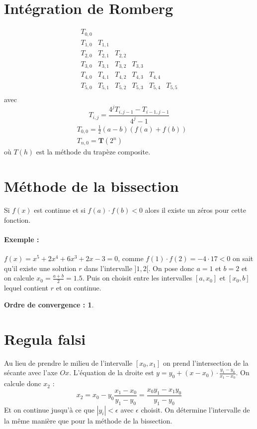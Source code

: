 \documentclass[a4paper,9pt]{extarticle}
\begin{document}
\begin{multicols*}{2}
\section{Intégration de Romberg}
$$
\begin{array}{cccccc}
T_{0,0} & & & & & \\
T_{1,0} & T_{1,1} & & & & \\
T_{2,0} & T_{2,1} & T_{2,2} & & & \\
T_{3,0} & T_{3,1} & T_{3,2} & T_{3,3} & & \\
T_{4,0} & T_{4,1} & T_{4,2} & T_{4,3} & T_{4,4} & \\
T_{5,0} & T_{5,1} & T_{5,2} & T_{5,3} & T_{5,4} & T_{5,5} \\
\end{array}
$$
avec
$$
T_{i,j}=\frac{4^jT_{i,j-1}-T_{i-1,j-1}}{4^j-1}
$$
\begin{align*}
& T_{0,0}=\frac{1}{2}(a-b)(f(a)+f(b))\\
& T_{n,0}=\textbf{T}(2^n)
\end{align*}
où $T(h)$ est la méthode du trapèze composite.

\section{Méthode de la bissection}

Si $f(x)$ est continue et si $f(a) \cdot f(b) < 0$ alors il existe un zéros pour cette fonction.

\paragraph*{Exemple :} $f(x)=x^5+2x^4+6x^3+2x-3=0$, comme $f(1)\cdot f(2) = -4 \cdot 17 < 0$ on sait qu'il existe une solution $r$ dans l'intervalle $]1,2[$. On pose donc $a=1$ et $b=2$ et on calcule $x_0=\frac{a+b}{2}=1.5$. Puis on choisit entre les intervalles $[a,x_0]$ et $[x_0,b]$ lequel contient $r$ et on continue.

\textbf{Ordre de convergence : 1}.

\section{Regula falsi}

Au lieu de prendre le milieu de l'intervalle $[x_0,x_1]$ on prend l'intersection de la sécante avec l'axe $Ox$. L'équation de la droite est $y=y_0+(x-x_0)\cdot\frac{y_1-y_0}{x_1-x_0}$. On calcule donc $x_2$ :
$$
x_2=x_0-y_0\frac{x_1-x_0}{y_1-y_0}=\frac{x_0y_1-x_1y_0}{y_1-y_0}
$$
Et on continue jusqu'à ce que $|y_i| < \epsilon$ avec $\epsilon$ choisit. On détermine l'intervalle de la même manière que pour la méthode de la bissection.


\end{multicols*}
\end{document}

